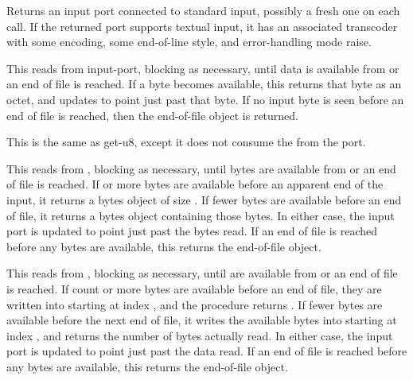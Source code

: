 \begin{entry}{%
}
   
Returns an input port connected to standard input, possibly a fresh
one on each call.  If the returned port supports textual input, it has
an associated transcoder with some encoding, some end-of-line style,
and error-handling mode {\cf raise}.
\end{entry}

\begin{entry}{%
}
   
This reads from input-port, blocking as necessary, until data is
available from  or an end of file is reached. If a
byte becomes available, this returns that byte as an octet, and
updates  to point just past that byte. If no input
byte is seen before an end of file is reached, then the end-of-file
object is returned.
\end{entry}

\begin{entry}{%
}
   
This is the same as {\cf get-u8}, except it does not consume the
 from the port.
\end{entry}

\begin{entry}{%
}
   
This reads from , blocking as necessary, until 
bytes are available from  or an end of file is
reached. If  or more bytes are available before an apparent end
of the input, it returns a bytes object of size . If fewer
bytes are available before an end of file, it returns a bytes object
containing those bytes. In either case, the input port is updated to
point just past the bytes read.  If an end of file is reached before
any bytes are available, this returns the end-of-file object.
\end{entry}

\begin{entry}{%
}
   
   
This reads from , blocking as necessary, until
 are available from  or an end of file is
reached. If count or more bytes are available before an end of file,
they are written into  starting at index , and
the procedure returns . If fewer bytes are available before
the next end of file, it writes the available bytes into 
starting at index , and returns the number of bytes actually
read. In either case, the input port is updated to point just past the
data read. If an end of file is reached before any bytes
are available, this returns the end-of-file object.
\end{entry}

